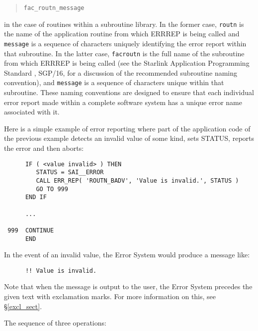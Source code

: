 \documentclass[twoside,11pt]{article}
\newcommand{\htmlref}[2]{#1}
\newcommand{\latex}[1]{#1}
\newcommand{\xref}[3]{#1}
\renewcommand{\_}{\texttt{\symbol{95}}}
\begin{document}
\begin {quote}
\begin {small}
\begin{verbatim}
fac_routn_message
\end{verbatim}
\end {small}
\end {quote}

in the case of routines within a subroutine library.
In the former case, \texttt{routn} is the name of the application routine from
which ERR\_REP is being called and \texttt{message} is a sequence of characters
uniquely identifying the error report within that subroutine.
In the latter case, \texttt{fac\_routn} is the full name of the subroutine from
which ERR\_REP is being called (see the
\xref{Starlink Application Programming Standard}{sgp16}{}
\latex{, SGP/16,} for a discussion of the recommended subroutine naming
convention), and \texttt{message} is a sequence of characters unique within
that subroutine.
These naming conventions are designed to ensure that each individual error
report made within a complete software system has a unique error name
associated with it.

Here is a simple example of error reporting where part of the application
code of the previous example detects an invalid value of some kind, sets
STATUS, reports the error and then aborts:

\begin {small}
\begin{verbatim}
      IF ( <value invalid> ) THEN
         STATUS = SAI__ERROR
         CALL ERR_REP( 'ROUTN_BADV', 'Value is invalid.', STATUS )
         GO TO 999
      END IF

      ...

 999  CONTINUE
      END
\end{verbatim}
\end {small}

In the event of an invalid value, the Error System would produce a message
like:
\begin{small}
\begin{verbatim}
      !! Value is invalid.
\end{verbatim}
\end{small}
Note that when the message is output to the user, the Error System precedes
the given text with
\htmlref{exclamation marks}{excl_sect}.
\latex{For more information on this, see \S\ref{excl_sect}.}

The sequence of three operations:
\end{document}
